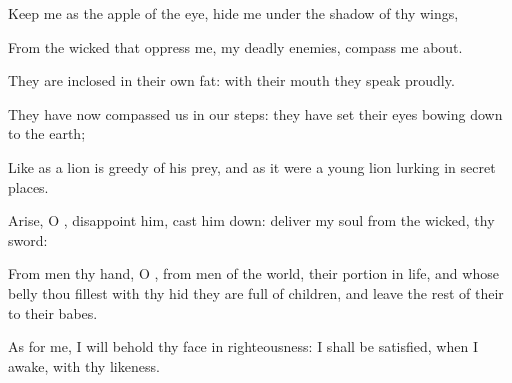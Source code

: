 {\Q {}Keep me as the
apple of the
eye,
hide me under the
shadow of thy
wings,


\par }{\Q {}From the
wicked
that
oppress me,
{} my
deadly
enemies,
{} compass me
about.


\par }{\Q {}They are
inclosed in their own
fat: with their
mouth they
speak
proudly.


\par }{\Q {}They have now
compassed us in our
steps: they have
set their
eyes bowing
down to the
earth;


\par }{\Q {}Like as a
lion
{} is
greedy of his
prey, and as it were a young
lion
lurking in secret
places.


\par }{\Q {}Arise, O
{},
disappoint
him, cast him
down:
deliver my
soul from the
wicked,
{} thy
sword:


\par }{\Q {}From
men
{} thy
hand, O
{}, from
men of the
world,
{} their
portion in
{}
life, and whose
belly thou
fillest with thy
hid
{} they are
full of
children, and
leave the
rest of their
{} to their
babes.


\par }{\Q {}As for me, I will
behold thy
face in
righteousness: I shall be
satisfied, when I
awake, with thy
likeness.




\par }
